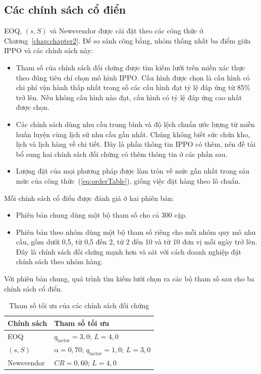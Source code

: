 \subsection{Các chính sách cổ điển}
\label{subsec:baselineCoDien}

EOQ, $(s, S)$ và Newsvendor được cài đặt theo các công thức ở Chương~\ref{chap:chapter2}. Để so sánh công bằng, nhóm thống nhất ba điểm giữa IPPO và các chính sách này:
\begin{itemize}
    \item Tham số của chính sách đối chứng được tìm kiếm lưới trên miền xác thực theo đúng tiêu chí chọn mô hình IPPO. Cấu hình được chọn là cấu hình có chi phí vận hành thấp nhất trong số các cấu hình đạt tỷ lệ đáp ứng từ 85\% trở lên. Nếu không cấu hình nào đạt, cấu hình có tỷ lệ đáp ứng cao nhất được chọn.
    \item Các chính sách dùng nhu cầu trung bình và độ lệch chuẩn ước lượng từ miền huấn luyện cùng lịch sử nhu cầu gần nhất. Chúng không biết sức chứa kho, lịch và lịch hàng về chi tiết. Đây là phần thông tin IPPO có thêm, nên đề tài bổ sung hai chính sách đối chứng có thêm thông tin ở các phần sau.
    \item Lượng đặt của mọi phương pháp được làm tròn về mức gần nhất trong sáu mức của công thức~(\ref{eq:orderTable}), giống việc đặt hàng theo lô chuẩn.
\end{itemize}

Mỗi chính sách cổ điển được đánh giá ở hai phiên bản:
\begin{itemize}
    \item Phiên bản chung dùng một bộ tham số cho cả 300 cặp.
    \item Phiên bản theo nhóm dùng một bộ tham số riêng cho mỗi nhóm quy mô nhu cầu, gồm dưới 0,5, từ 0,5 đến 2, từ 2 đến 10 và từ 10 đơn vị mỗi ngày trở lên. Đây là chính sách đối chứng mạnh hơn và sát với cách doanh nghiệp đặt chính sách theo nhóm hàng.
\end{itemize}

Với phiên bản chung, quá trình tìm kiếm lưới chọn ra các bộ tham số sau cho ba chính sách cổ điển.

\begin{table}[H]
    \centering
    \caption{Tham số tối ưu của các chính sách đối chứng}
    \label{tab:thamSoBaseline}
    \begin{tabular}{|l|l|}
        \hline
        Chính sách & Tham số tối ưu \\
        \hline
        EOQ        & $q_{\text{factor}} = 3{,}0$; $L = 4{,}0$ \\ \hline
        $(s, S)$   & $\alpha = 0{,}70$; $q_{\text{factor}} = 1{,}0$; $L = 3{,}0$ \\ \hline
        Newsvendor & $CR = 0{,}60$; $L = 4{,}0$ \\
        \hline
    \end{tabular}
\end{table}

